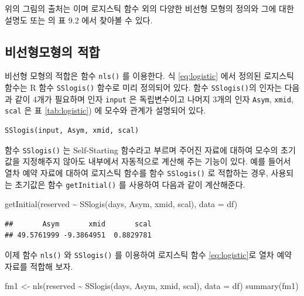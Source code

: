 \documentclass[
  10pt,
]{book}
\newenvironment{Shaded}{\begin{snugshade}}{\end{snugshade}}
\newcommand{\AttributeTok}[1]{\textcolor[rgb]{0.77,0.63,0.00}{#1}}
\newcommand{\FunctionTok}[1]{\textcolor[rgb]{0.00,0.00,0.00}{#1}}
\newcommand{\NormalTok}[1]{#1}
\newcommand{\OtherTok}[1]{\textcolor[rgb]{0.56,0.35,0.01}{#1}}
\newcommand{\SpecialCharTok}[1]{\textcolor[rgb]{0.00,0.00,0.00}{#1}}
\theoremstyle{definition}
\theoremstyle{definition}
\theoremstyle{definition}
\theoremstyle{definition}
\theoremstyle{remark}
\begin{document}
위의 그림의 출처는 \citet{pinheiro2006mixed} 이며 로지스틱 함수 외의 다양한 비선형 모형의 정의와 그에 대한 설명도
\citet{pinheiro2006mixed} 또는 \citet{kang2016you} 의 표 9.2 에서 찾아볼 수 있다.

\hypertarget{uxbe44uxc120uxd615uxbaa8uxd615uxc758-uxc801uxd569}{%
\subsection{비선형모형의 적합}\label{uxbe44uxc120uxd615uxbaa8uxd615uxc758-uxc801uxd569}}

비선형 모형의 적합은 함수 \texttt{nls()} 를 이용한다. 식 \eqref{eq:logistic} 에서 정의된 로지스틱 함수는
R 함수 \texttt{SSlogis()} 함수로 미리 정의되어 있다. 함수 \texttt{SSlogis()}의 인자는 다음과 같이 4개가 필요하며
인자 \texttt{input} 은 독립변수이고 나머지 3개의 인자 \texttt{Asym}, \texttt{xmid}, \texttt{scal} 은 표 \ref{tab:logistic}) 에 모수와 관계가 설명되어 있다.

\begin{verbatim}
SSlogis(input, Asym, xmid, scal)
\end{verbatim}

함수 \texttt{SSlogis()} 는 Self-Starting 함수라고 부르며 주어진 자료에 대하여 모수의 초기값을 지정해주지 않아도 내부에서 자동적으로 계산해 주는 기능이 있다. 예를 들어서 열차 예약 자료에 대하여 로지스틱 함수를 함수 \texttt{SSlogis()} 로 적합하는 경우, 사용되는 초기값은 함수 \texttt{getInitial()} 를 사용하여 다음과 같이 계산해준다.

\begin{Shaded}
\begin{Highlighting}[]
\FunctionTok{getInitial}\NormalTok{(reserved }\SpecialCharTok{\textasciitilde{}} \FunctionTok{SSlogis}\NormalTok{(days, Asym, xmid, scal), }\AttributeTok{data =}\NormalTok{ df)}
\end{Highlighting}
\end{Shaded}

\begin{verbatim}
##       Asym       xmid       scal 
## 49.5761999 -9.3864951  0.8829781
\end{verbatim}

이제 함수 \texttt{nls()} 와 \texttt{SSlogis()} 를 이용하여 로지스틱 함수 \eqref{eq:logistic}로 열차 예약 자료를 적합해 보자.

\begin{Shaded}
\begin{Highlighting}[]
\NormalTok{fm1 }\OtherTok{\textless{}{-}} \FunctionTok{nls}\NormalTok{(reserved }\SpecialCharTok{\textasciitilde{}} \FunctionTok{SSlogis}\NormalTok{(days, Asym, xmid, scal), }\AttributeTok{data =}\NormalTok{ df)}
\FunctionTok{summary}\NormalTok{(fm1)}
\end{Highlighting}
\end{Shaded}
\end{document}
